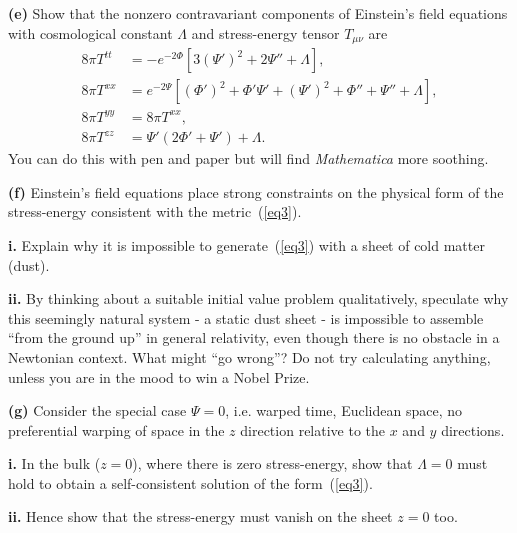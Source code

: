\documentclass[a4paper]{article} %
\begin{document}
\begin{framed}
\textbf{(e)} Show that the nonzero contravariant components of Einstein’s field equations with
cosmological constant $\Lambda$ and stress-energy tensor $T_{\mu\nu}$ are
\begin{align}
8\pi T^{tt}&=-e^{-2\Phi}[3(\Psi')^2+2\Psi''+\Lambda],\\
8\pi T^{xx}&=e^{-2\Psi}[(\Phi')^2+\Phi' \Psi' + (\Psi')^2+\Phi'' + \Psi'' + \Lambda],\\
8\pi T^{yy}&=8\pi T^{xx},\\
8\pi T^{zz}&=\Psi'(2\Phi' + \Psi')+\Lambda.
\end{align}
You can do this with pen and paper but will find \emph{Mathematica} more soothing.
\end{framed}

\begin{framed}
\textbf{(f)} Einstein’s field equations place strong constraints on the physical form of the
stress-energy consistent with the metric~(\ref{eq3}).
\end{framed}

\begin{framed}
\textbf{i.} Explain why it is impossible to generate~(\ref{eq3}) with a sheet of cold matter (dust).
\end{framed}

\begin{framed}
\textbf{ii.} By thinking about a suitable initial value problem qualitatively, speculate why this seemingly natural system - a static dust sheet - is impossible to assemble ``from the ground up'' in general relativity, even though there is no obstacle in a Newtonian context. What might ``go wrong''? Do not try calculating anything, unless you are in the mood to win a Nobel Prize.
\end{framed}

\begin{framed}
\textbf{(g)} Consider the special case $\Psi=0$, i.e. warped time, Euclidean space, no preferential
warping of space in the $z$ direction relative to the $x$ and $y$ directions.
\end{framed}

\begin{framed}
\textbf{i.} In the bulk ($z=0$), where there is zero stress-energy, show that $\Lambda=0$ must
hold to obtain a self-consistent solution of the form~(\ref{eq3}).
\end{framed}

\begin{framed}
\textbf{ii.} Hence show that the stress-energy must vanish on the sheet $z = 0$ too.
\end{framed}
\end{document}
